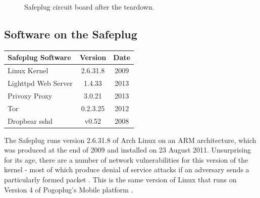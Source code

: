 \documentclass[conference]{IEEEtran}
\begin{document}
\begin{figure}[tb]
\centering
{}
\qquad
{}
\caption{Safeplug circuit board after the teardown.}
\label{fig:circuit}
\end{figure}

\subsection{Software on the Safeplug}
\label{versions}
\begin{center}
  \begin{tabular}{|l|c|c|}
    \hline
    Safeplug Software & Version & Date \\ \hline
    Linux Kernel & 2.6.31.8 & 2009 \\ \hline
    Lighttpd Web Server & 1.4.33 & 2013 \\ \hline
    Privoxy Proxy & 3.0.21 & 2013 \\ \hline
    Tor & 0.2.3.25 & 2012 \\ \hline
    Dropbear sshd & v0.52 & 2008 \\ \hline
  \end{tabular}
\end{center}

The Safeplug runs version 2.6.31.8 of Arch Linux on an ARM architecture, which was produced at the end of 2009 and installed on 23 August 2011.  Unsurprising for its age, there are a number of network vulnerabilities for this version of the kernel - most of which produce denial of service attacks if an adversary sends a particularly formed packet \cite{kernelcve}.  This is the same version of Linux that runs on Version 4 of Pogoplug's Mobile platform \cite{archforum}.
\end{document}
